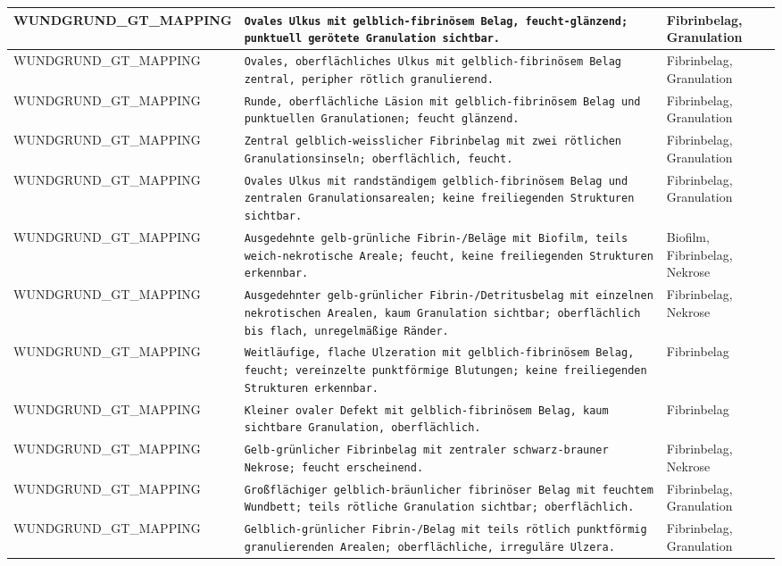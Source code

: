 \begin{longtable}{|p{3.5cm}|p{5cm}|p{6.5cm}|}
WUNDGRUND\_GT\_MAPPING & \texttt{Ovales Ulkus mit gelblich-fibrinösem Belag, feucht-glänzend; punktuell gerötete Granulation sichtbar.} & Fibrinbelag, Granulation \\ \hline
WUNDGRUND\_GT\_MAPPING & \texttt{Ovales, oberflächliches Ulkus mit gelblich-fibrinösem Belag zentral, peripher rötlich granulierend.} & Fibrinbelag, Granulation \\ \hline
WUNDGRUND\_GT\_MAPPING & \texttt{Runde, oberflächliche Läsion mit gelblich-fibrinösem Belag und punktuellen Granulationen; feucht glänzend.} & Fibrinbelag, Granulation \\ \hline
WUNDGRUND\_GT\_MAPPING & \texttt{Zentral gelblich-weisslicher Fibrinbelag mit zwei rötlichen Granulationsinseln; oberflächlich, feucht.} & Fibrinbelag, Granulation \\ \hline
WUNDGRUND\_GT\_MAPPING & \texttt{Ovales Ulkus mit randständigem gelblich-fibrinösem Belag und zentralen Granulationsarealen; keine freiliegenden Strukturen sichtbar.} & Fibrinbelag, Granulation \\ \hline
WUNDGRUND\_GT\_MAPPING & \texttt{Ausgedehnte gelb-grünliche Fibrin-/Beläge mit Biofilm, teils weich-nekrotische Areale; feucht, keine freiliegenden Strukturen erkennbar.} & Biofilm, Fibrinbelag, Nekrose \\ \hline
WUNDGRUND\_GT\_MAPPING & \texttt{Ausgedehnter gelb-grünlicher Fibrin-/Detritusbelag mit einzelnen nekrotischen Arealen, kaum Granulation sichtbar; oberflächlich bis flach, unregelmäßige Ränder.} & Fibrinbelag, Nekrose \\ \hline
WUNDGRUND\_GT\_MAPPING & \texttt{Weitläufige, flache Ulzeration mit gelblich-fibrinösem Belag, feucht; vereinzelte punktförmige Blutungen; keine freiliegenden Strukturen erkennbar.} & Fibrinbelag \\ \hline
WUNDGRUND\_GT\_MAPPING & \texttt{Kleiner ovaler Defekt mit gelblich-fibrinösem Belag, kaum sichtbare Granulation, oberflächlich.} & Fibrinbelag \\ \hline
WUNDGRUND\_GT\_MAPPING & \texttt{Gelb-grünlicher Fibrinbelag mit zentraler schwarz-brauner Nekrose; feucht erscheinend.} & Fibrinbelag, Nekrose \\ \hline
WUNDGRUND\_GT\_MAPPING & \texttt{Großflächiger gelblich-bräunlicher fibrinöser Belag mit feuchtem Wundbett; teils rötliche Granulation sichtbar; oberflächlich.} & Fibrinbelag, Granulation \\ \hline
WUNDGRUND\_GT\_MAPPING & \texttt{Gelblich-grünlicher Fibrin-/Belag mit teils rötlich punktförmig granulierenden Arealen; oberflächliche, irreguläre Ulzera.} & Fibrinbelag, Granulation \\ \hline

\end{longtable}
